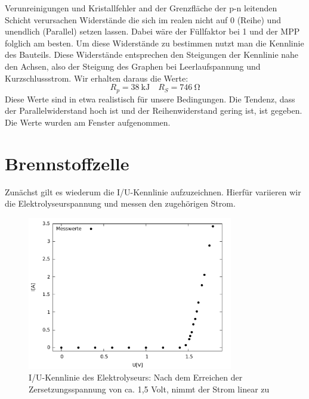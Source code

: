 Verunreinigungen und Kristallfehler and der Grenzfläche der p-n leitenden Schicht verursachen Widerstände die sich im realen nicht auf 0 (Reihe) und unendlich (Parallel) setzen lassen.
Dabei wäre der Füllfaktor bei 1 und der MPP folglich am besten.
Um diese Widerstände zu bestimmen nutzt man die Kennlinie des Bauteils.
Diese Widerstände entsprechen den Steigungen der Kennlinie nahe den Achsen, also der Steigung des Graphen bei Leerlaufspannung und Kurzschlussstrom.
Wir erhalten daraus die Werte:
\[
R_p=\SI{38}{\kilo \joule} \quad
R_S=\SI{746}{\ohm}
\]
Diese Werte sind in etwa realistisch für unsere Bedingungen. Die Tendenz, dass der Parallelwiderstand hoch ist und der Reihenwiderstand gering ist, ist gegeben. Die Werte wurden am Fenster aufgenommen.

\section{Brennstoffzelle}
Zunächst gilt es wiederum die I/U-Kennlinie aufzuzeichnen. Hierfür variieren wir die Elektrolyseurspannung und messen den zugehörigen Strom.
\begin{figure}[htbp]
	\centering
	\includegraphics[width=0.8\textwidth]{mess/aufg7.pdf}
	\caption{I/U-Kennlinie des Elektrolyseurs: Nach dem Erreichen der Zersetzungsspannung von ca. 1,5 Volt, nimmt der Strom linear zu}
	\label{a7}
\end{figure}

